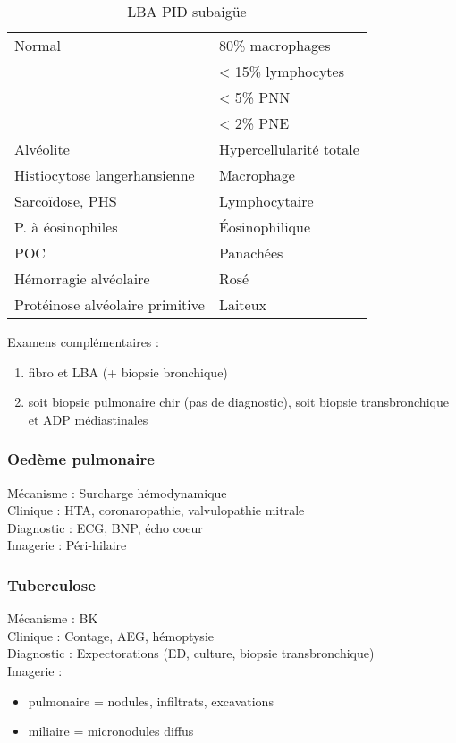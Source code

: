 \documentclass{article}
\begin{document}
\begin{table}[htbp]
  \caption{LBA PID subaigüe}
  \centering
  \begin{tabular}{ll}
    \toprule
    Normal & 80\% macrophages\\
           & < 15\% lymphocytes\\
           & < 5\% PNN\\
           & < 2\% PNE\\
    \midrule
    Alvéolite & Hypercellularité totale\\
    Histiocytose langerhansienne & Macrophage\\
    Sarcoïdose, PHS & Lymphocytaire\\
    P. à éosinophiles & Éosinophilique\\
    \gls{POC} & Panachées\\
    Hémorragie alvéolaire & Rosé\\
    Protéinose alvéolaire primitive & Laiteux\\
    \bottomrule
  \end{tabular}
\end{table}

Examens complémentaires :
\begin{enumerate}
\item fibro et LBA (+ biopsie bronchique)
\item soit biopsie pulmonaire chir (pas de diagnostic), soit biopsie
  transbronchique et ADP médiastinales
\end{enumerate}

\subsubsection{Oedème pulmonaire}
Mécanisme : Surcharge hémodynamique\\
Clinique : HTA, coronaropathie, valvulopathie mitrale\\
Diagnostic : ECG, BNP, écho coeur\\
Imagerie : Péri-hilaire

\subsubsection{Tuberculose}
Mécanisme : BK\\
Clinique : Contage, AEG, hémoptysie\\
Diagnostic : Expectorations (ED, culture, biopsie transbronchique)\\
Imagerie : 
\begin{itemize}
\item pulmonaire = nodules, infiltrats, excavations
\item miliaire = micronodules diffus
\end{itemize}
\end{document}
